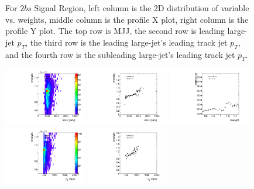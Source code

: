 \begin{figure}[htbp!]
\begin{center}
\caption{For $2bs$ Signal Region, left column is the 2D distribution of variable vs. weights, middle column is the profile X plot, right column is the profile Y plot. The top row is MJJ, the second row is leading large-\R jet $p_{T}$, the third row is the leading large-\R jet's leading track jet $p_{T}$, and the fourth row is the subleading large-\R jet's leading track jet $p_{T}$.}
\label{fig:app-reweight-dist-2b-SR}
\end{center}
\end{figure}


\begin{figure}[htbp!]
\begin{center}
\includegraphics[width=0.32\textwidth,angle=-90]{figures/boosted/AppendixReweight/Weights/3Trk_Signal_mHH_l_weight.pdf}
\includegraphics[width=0.32\textwidth,angle=-90]{figures/boosted/AppendixReweight/Weights/3Trk_Signal_mHH_l_weight_profx.pdf}
\includegraphics[width=0.32\textwidth,angle=-90]{figures/boosted/AppendixReweight/Weights/3Trk_Signal_mHH_l_weight_profy.pdf}\\
\includegraphics[width=0.32\textwidth,angle=-90]{figures/boosted/AppendixReweight/Weights/3Trk_Signal_leadHCand_Pt_m_weight.pdf}
\includegraphics[width=0.32\textwidth,angle=-90]{figures/boosted/AppendixReweight/Weights/3Trk_Signal_leadHCand_Pt_m_weight_profx.pdf}

\end{center}
\end{figure}
